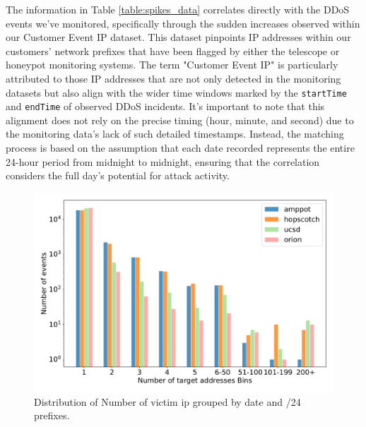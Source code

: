 The information in Table \ref{table:spikes_data} correlates directly with the DDoS events we've monitored, specifically through the sudden increases observed within our Customer Event IP dataset. This dataset pinpoints IP addresses within our customers' network prefixes that have been flagged by either the telescope or honeypot monitoring systems. The term "Customer Event IP" is particularly attributed to those IP addresses that are not only detected in the monitoring datasets but also align with the wider time windows marked by the \texttt{startTime} and \texttt{endTime} of observed DDoS incidents. It's important to note that this alignment does not rely on the precise timing (hour, minute, and second) due to the monitoring data's lack of such detailed timestamps. Instead, the matching process is based on the assumption that each date recorded represents the entire 24-hour period from midnight to midnight, ensuring that the correlation considers the full day's potential for attack activity.


\begin{figure}[htbp]
    \centering
    \includegraphics[scale=0.48]{graphs/space_bin_log.pdf}
    \caption{Distribution of Number of victim ip grouped by date and /24 prefixes.}
    \label{fig:akamai_spikes}
\end{figure}


